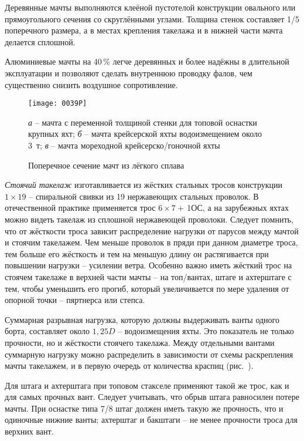 Деревянные мачты выполняются клеёной пустотелой конструкции овального
или прямоугольного сечения со скруглёнными углами. Толщина стенок
составляет 1/5 поперечного размера, а в местах крепления такелажа и в
нижней части мачта делается сплошной.

Алюминиевые мачты на 40\,\% легче деревянных и более надёжны в
длительной эксплуатации и позволяют сделать внутреннюю проводку фалов,
чем существенно снизить воздушное сопротивление.

\begin{figure}[htb]
  \centering{}
  \texttt{[image: 0039P]}
  \caption{Поперечное сечение мачт из лёгкого сплава}
  \label{fig:39}
  \centering{}
  \small
  \textit{а} \--- мачта с переменной толщиной стенки для топовой оснастки крупных яхт; \textit{б} \--- мачта крейсерской яхты водоизмещением около 3~т; \textit{в} \--- мачта мореходной крейсерско\-/гоночной яхты
\end{figure}

\textit{Стоячий такелаж}
изготавливается из жёстких стальных тросов конструкции
$1 \times 19$ \--- спиральной свивки из 19 нержавеющих стальных
проволок. В отечественной практике применяется трос
$6 \times 7 + $\,1ОС, а на зарубежных яхтах можно видеть такелаж из
сплошной нержавеющей проволоки. Следует помнить, что от жёсткости
троса зависит распределение нагрузки от парусов между мачтой и стоячим
такелажем. Чем меньше проволок в пряди при данном диаметре троса, тем
больше его жёсткость и тем на меньшую длину он растягивается при
повышении нагрузки \--- усилении ветра. Особенно важно иметь жёсткий
трос на стоячем такелаже в верхней части мачты \--- на топ\-/вантах,
штаге и ахтерштаге с тем, чтобы уменьшить его прогиб, который
увеличивается по мере удаления от опорной точки \--- пяртнерса или
степса.

Суммарная разрывная нагрузка, которую должны выдерживать ванты одного
борта, составляет около $1,25D$ \--- водоизмещения яхты. Это
показатель не только прочности, но и жёсткости стоячего
такелажа. Между отдельными вантами суммарную нагрузку можно
распределить в зависимости от схемы раскрепления мачты такелажем, и в
первую очередь от количества краспиц (рис.~).

Для штага и ахтерштага при топовом стакселе применяют такой же трос,
как и для самых прочных вант. Следует учитывать, что обрыв штага
равносилен потере мачты. При оснастке типа 7/8 штаг должен иметь такую
же прочность, что и одиночные нижние ванты; ахтерштаг и бакштаги \---
не менее прочности троса для верхних вант.

